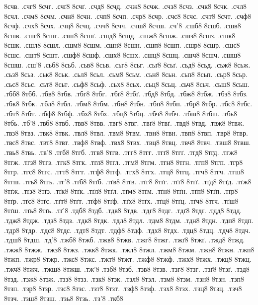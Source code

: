 {8счв.
.счг8
8счг.
.счґ8
8счґ.
.счд8
8счд.
.счж8
8счж.
.счз8
8счз.
.счк8
8счк.
.счл8
8счл.
.счм8
8счм.
.счн8
8счн.
.счп8
8счп.
.счр8
8счр.
.счс8
8счс.
.счт8
8счт.
.счф8
8счф.
.счх8
8счх.
.счц8
8счц.
.счч8
8счч.
.счш8
8счш.
.сч'8
.сшб8
8сшб.
.сшв8
8сшв.
.сшг8
8сшг.
.сшґ8
8сшґ.
.сшд8
8сшд.
.сшж8
8сшж.
.сшз8
8сшз.
.сшк8
8сшк.
.сшл8
8сшл.
.сшм8
8сшм.
.сшн8
8сшн.
.сшп8
8сшп.
.сшр8
8сшр.
.сшс8
8сшс.
.сшт8
8сшт.
.сшф8
8сшф.
.сшх8
8сшх.
.сшц8
8сшц.
.сшч8
8сшч.
.сшш8
8сшш.
.сш'8
.сьб8
8сьб.
.сьв8
8сьв.
.сьг8
8сьг.
.сьґ8
8сьґ.
.сьд8
8сьд.
.сьж8
8сьж.
.сьз8
8сьз.
.ськ8
8ськ.
.сьл8
8сьл.
.сьм8
8сьм.
.сьн8
8сьн.
.сьп8
8сьп.
.сьр8
8сьр.
.сьс8
8сьс.
.сьт8
8сьт.
.сьф8
8сьф.
.сьх8
8сьх.
.сьц8
8сьц.
.сьч8
8сьч.
.сьш8
8сьш.
.тбб8
8тбб.
.тбв8
8тбв.
.тбг8
8тбг.
.тбґ8
8тбґ.
.тбд8
8тбд.
.тбж8
8тбж.
.тбз8
8тбз.
.тбк8
8тбк.
.тбл8
8тбл.
.тбм8
8тбм.
.тбн8
8тбн.
.тбп8
8тбп.
.тбр8
8тбр.
.тбс8
8тбс.
.тбт8
8тбт.
.тбф8
8тбф.
.тбх8
8тбх.
.тбц8
8тбц.
.тбч8
8тбч.
.тбш8
8тбш.
.тбь8
8тбь.
.тб'8
.твб8
8твб.
.твв8
8твв.
.твг8
8твг.
.твґ8
8твґ.
.твд8
8твд.
.твж8
8твж.
.твз8
8твз.
.твк8
8твк.
.твл8
8твл.
.твм8
8твм.
.твн8
8твн.
.твп8
8твп.
.твр8
8твр.
.твс8
8твс.
.твт8
8твт.
.твф8
8твф.
.твх8
8твх.
.твц8
8твц.
.твч8
8твч.
.твш8
8твш.
.твь8
8твь.
.тв'8
.тгб8
8тгб.
.тгв8
8тгв.
.тгг8
8тгг.
.тгґ8
8тгґ.
.тгд8
8тгд.
.тгж8
8тгж.
.тгз8
8тгз.
.тгк8
8тгк.
.тгл8
8тгл.
.тгм8
8тгм.
.тгн8
8тгн.
.тгп8
8тгп.
.тгр8
8тгр.
.тгс8
8тгс.
.тгт8
8тгт.
.тгф8
8тгф.
.тгх8
8тгх.
.тгц8
8тгц.
.тгч8
8тгч.
.тгш8
8тгш.
.тгь8
8тгь.
.тг'8
.тґб8
8тґб.
.тґв8
8тґв.
.тґг8
8тґг.
.тґґ8
8тґґ.
.тґд8
8тґд.
.тґж8
8тґж.
.тґз8
8тґз.
.тґк8
8тґк.
.тґл8
8тґл.
.тґм8
8тґм.
.тґн8
8тґн.
.тґп8
8тґп.
.тґр8
8тґр.
.тґс8
8тґс.
.тґт8
8тґт.
.тґф8
8тґф.
.тґх8
8тґх.
.тґц8
8тґц.
.тґч8
8тґч.
.тґш8
8тґш.
.тґь8
8тґь.
.тґ'8
.тдб8
8тдб.
.тдв8
8тдв.
.тдг8
8тдг.
.тдґ8
8тдґ.
.тдд8
8тдд.
.тдж8
8тдж.
.тдз8
8тдз.
.тдк8
8тдк.
.тдл8
8тдл.
.тдм8
8тдм.
.тдн8
8тдн.
.тдп8
8тдп.
.тдр8
8тдр.
.тдс8
8тдс.
.тдт8
8тдт.
.тдф8
8тдф.
.тдх8
8тдх.
.тдц8
8тдц.
.тдч8
8тдч.
.тдш8
8тдш.
.тд'8
.тжб8
8тжб.
.тжв8
8тжв.
.тжг8
8тжг.
.тжґ8
8тжґ.
.тжд8
8тжд.
.тжж8
8тжж.
.тжз8
8тжз.
.тжк8
8тжк.
.тжл8
8тжл.
.тжм8
8тжм.
.тжн8
8тжн.
.тжп8
8тжп.
.тжр8
8тжр.
.тжс8
8тжс.
.тжт8
8тжт.
.тжф8
8тжф.
.тжх8
8тжх.
.тжц8
8тжц.
.тжч8
8тжч.
.тжш8
8тжш.
.тж'8
.тзб8
8тзб.
.тзв8
8тзв.
.тзг8
8тзг.
.тзґ8
8тзґ.
.тзд8
8тзд.
.тзж8
8тзж.
.тзз8
8тзз.
.тзк8
8тзк.
.тзл8
8тзл.
.тзм8
8тзм.
.тзн8
8тзн.
.тзп8
8тзп.
.тзр8
8тзр.
.тзс8
8тзс.
.тзт8
8тзт.
.тзф8
8тзф.
.тзх8
8тзх.
.тзц8
8тзц.
.тзч8
8тзч.
.тзш8
8тзш.
.тзь8
8тзь.
.тз'8
.ткб8
}
